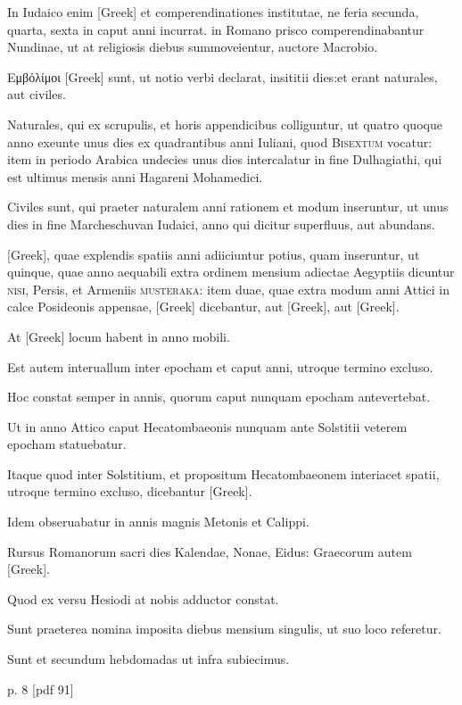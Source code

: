 In Iudaico enim \textgreek{[Greek]} et comperendinationes institutae, ne
feria secunda, quarta, sexta in caput anni incurrat. in Romano prisco
comperendinabantur Nundinae, ut at religiosis diebus summoveientur,
auctore Macrobio.

\textgreek{Εμβόλίμοι [Greek]} sunt, ut notio verbi declarat, insititii
dies:et erant naturales, aut civiles.

Naturales, qui ex scrupulis, et
horis appendicibus colliguntur, ut quatro quoque anno exeunte unus
dies ex quadrantibus anni Iuliani, quod \textsc{Bisextum} vocatur: item
in periodo Arabica undecies unus dies intercalatur in fine Dulhagiathi,
qui est ultimus mensis anni Hagareni Mohamedici.

Civiles sunt,
qui praeter naturalem anni rationem et modum inseruntur, ut unus
dies in fine Marcheschuvan Iudaici, anno qui dicitur superfluus, aut
abundans.

\textgreek{[Greek]}, quae explendis spatiis anni adiiciuntur potius,
quam inseruntur, ut quinque, quae anno aequabili extra ordinem mensium
adiectae Aegyptiis dicuntur \textsc{nisi}, Persis, et Armeniis \textsc{musteraka}: 
item duae, quae extra modum anni Attici in calce Posideonis
appensae, \textgreek{[Greek]} dicebantur,
 aut \textgreek{[Greek]}, aut \textgreek{[Greek]}.

At \textgreek{[Greek]} locum habent in anno mobili.

Est autem interuallum
inter epocham et caput anni, utroque termino excluso.

Hoc
constat semper in annis, quorum caput nunquam epocham antevertebat.

Ut in anno Attico caput Hecatombaeonis nunquam ante Solstitii
veterem epocham statuebatur.

Itaque quod inter Solstitium, et
propositum Hecatombaeonem interiacet spatii, utroque termino excluso,
dicebantur \textgreek{[Greek]}.

Idem obseruabatur in annis magnis
Metonis et Calippi.

Rursus Romanorum sacri dies Kalendae, Nonae,
Eidus: Graecorum autem \textgreek{[Greek]}.

Quod ex versu Hesiodi at
nobis adductor constat.

Sunt praeterea nomina imposita diebus mensium
singulis, ut suo loco referetur.

Sunt et secundum hebdomadas
ut infra subiecimus.

p. 8 [pdf 91]



